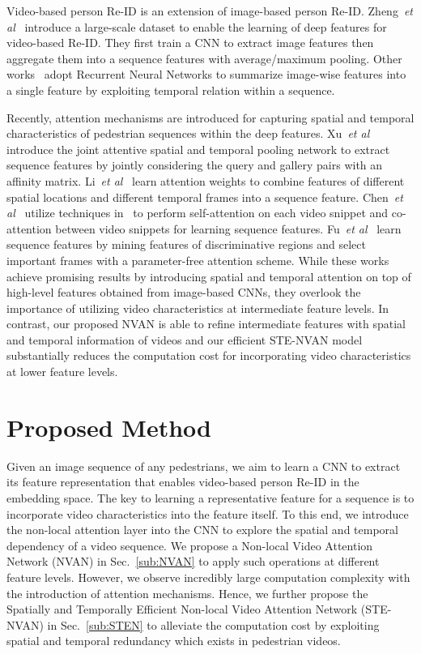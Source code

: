 \documentclass{bmvc2k}
\newcommand{\revctliu}[1]{#1}
\newcommand{\revctliu}[1]{\textcolor{brown}{#1}}
\def\etal{\emph{et al}\bmvaOneDot}
\begin{document}
Video-based person Re-ID is an extension of image-based person Re-ID. 
Zheng~\etal~\cite{mars} introduce a large-scale dataset to enable the learning of deep features for video-based Re-ID.
They first train a CNN to extract image features then aggregate them into a sequence features with average/maximum pooling. 
Other works~\cite{rcnn,forest,recurrent} adopt Recurrent Neural Networks to summarize image-wise features into a \revctliu{single feature} by exploiting temporal relation within a sequence.


Recently, attention mechanisms are introduced for capturing spatial and temporal characteristics of pedestrian sequences within the deep features. 
Xu~\etal~\cite{jointatten} introduce the joint attentive spatial and temporal pooling network to extract sequence features by jointly considering the query and gallery pairs \revctliu{with an affinity matrix}. Li~\etal~\cite{diversity} learn attention weights to combine features of different spatial locations and different temporal frames into a sequence feature.
Chen~\etal~\cite{snip} utilize techniques in~\cite{attention_is_all} to perform self-attention on each video snippet and co-attention between video snippets for learning sequence features.
Fu~\etal~\cite{sta} learn sequence features by mining features of discriminative regions and select important frames with a parameter-free attention scheme.
While these works achieve promising results by introducing spatial and temporal attention on top of high-level features obtained from image-based CNNs, they overlook the importance of utilizing video characteristics at intermediate feature levels.
In contrast, our proposed NVAN is able to refine intermediate features with spatial and temporal information of videos and our efficient STE-NVAN model substantially reduces the computation cost for incorporating video characteristics at lower feature levels. 
\vspace{-3mm} \section{Proposed Method}

Given an image sequence of any pedestrians, we aim to learn a CNN to extract its feature \revctliu{representation} that enables video-based person Re-ID in the embedding space.
The key to learning a representative feature for a sequence is to incorporate video characteristics into the feature itself.
To this end, we introduce the non-local attention layer into the CNN to explore the spatial and temporal dependency of a video sequence.
We propose a Non-local Video Attention Network (NVAN) in Sec.~\ref{sub:NVAN} to apply such operations at different feature levels.
However, we observe incredibly large computation complexity with the introduction of attention mechanisms.
Hence, we further propose the Spatially and Temporally Efficient Non-local Video Attention Network (STE-NVAN) in Sec.~\ref{sub:STEN} to alleviate the computation cost by exploiting spatial and temporal redundancy which exists in pedestrian videos.
\end{document}
